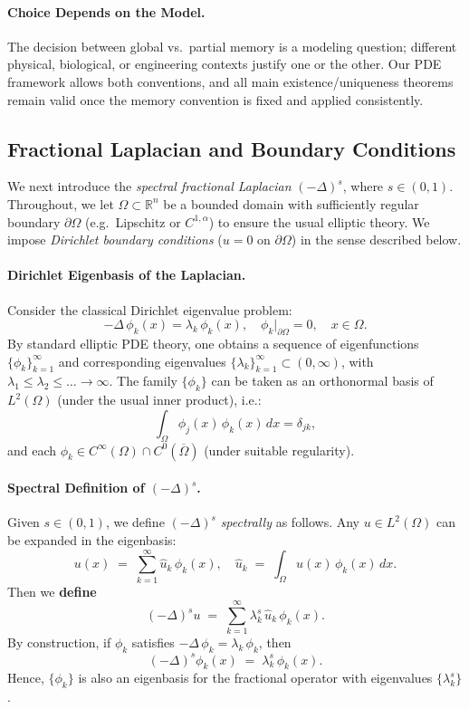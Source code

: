 \documentclass[12pt]{article}
\begin{document}
\paragraph{Choice Depends on the Model.}
The decision between global vs.\ partial memory is a modeling question; different 
physical, biological, or engineering contexts justify one or the other. Our PDE 
framework allows both conventions, and all main existence/uniqueness theorems 
remain valid once the memory convention is fixed and applied consistently.

\subsection{Fractional Laplacian and Boundary Conditions}
\label{subsec:frac_laplacian}

We next introduce the \emph{spectral fractional Laplacian} \((-\Delta)^s\), where 
\(s\in(0,1)\). Throughout, we let \(\Omega\subset\mathbb{R}^n\) be a bounded domain 
with sufficiently regular boundary \(\partial\Omega\) (e.g.\ Lipschitz or \(C^{1,\alpha}\)) 
to ensure the usual elliptic theory. We impose \emph{Dirichlet boundary conditions}
(\(u=0\) on \(\partial\Omega\)) in the sense described below.

\paragraph{Dirichlet Eigenbasis of the Laplacian.}
Consider the classical Dirichlet eigenvalue problem:
\[
-\Delta \,\phi_k(x) = \lambda_k \,\phi_k(x), 
\quad
\phi_k\big|_{\partial \Omega} = 0,
\quad
x\in \Omega.
\]
By standard elliptic PDE theory, one obtains a sequence of eigenfunctions
\(\{\phi_k\}_{k=1}^\infty\) and corresponding eigenvalues 
\(\{\lambda_k\}_{k=1}^\infty \subset (0,\infty)\), with 
\(\lambda_1 \le \lambda_2 \le \dots \to \infty\). The family 
\(\{\phi_k\}\) can be taken as an orthonormal basis of \(L^2(\Omega)\) 
(under the usual inner product), i.e.:
\[
\int_\Omega \phi_j(x)\,\phi_k(x)\,dx = \delta_{jk},
\]
and each \(\phi_k\in C^\infty(\Omega)\cap C^0(\overline{\Omega})\) (under suitable regularity).

\paragraph{Spectral Definition of \((- \Delta)^s\).}
Given \(s\in(0,1)\), we define \(\displaystyle (-\Delta)^s\) \emph{spectrally} as follows.
Any \(u\in L^2(\Omega)\) can be expanded in the eigenbasis:
\[
u(x)
\;=\;
\sum_{k=1}^\infty \hat{u}_k\,\phi_k(x),
\quad
\hat{u}_k
\;=\;
\int_\Omega u(x)\,\phi_k(x)\,dx.
\]
Then we \textbf{define}
\[
(-\Delta)^s u
\;=\;
\sum_{k=1}^\infty \lambda_k^s \,\hat{u}_k\,\phi_k(x).
\]
By construction, if \(\phi_k\) satisfies \(-\Delta \,\phi_k = \lambda_k\,\phi_k\), then
\[
(-\Delta)^s \phi_k(x)
\;=\;
\lambda_k^s\,\phi_k(x).
\]
Hence, \(\{\phi_k\}\) is also an eigenbasis for the fractional operator with eigenvalues
\(\{\lambda_k^s\}\).
\end{document}
